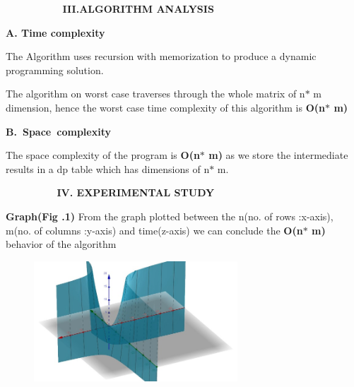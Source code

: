 \documentclass[10pt]{report}
\begin{document}
\begin{multicols}{2}
\vspace{\baselineskip}

\vspace{\baselineskip}

\vspace{\baselineskip}
\textbf{\ \ \ \ \ \ \ \ \ \   III.ALGORITHM ANALYSIS}\par


\vspace{\baselineskip}
\textbf{A. Time complexity}\par


\vspace{\baselineskip}
The\textbf{ }Algorithm uses recursion with memorization to produce a dynamic programming solution. \par

The algorithm on worst case traverses through the whole matrix of n$\ast$ m dimension, hence the worst case time complexity of this algorithm is  \textbf{O(n$\ast$ m)}\par


\vspace{\baselineskip}

\vspace{\baselineskip}
\textbf{B.\ Space\ complexity\    \ \ \ \ \  }\par


\vspace{\baselineskip}
The space complexity of the program is \textbf{O(n$\ast$ m)} as we store the intermediate results in a dp table which has dimensions of n$\ast$ m.\par


\vspace{\baselineskip}
\textbf{\ \ \ \ \ \ \ \  \  IV. EXPERIMENTAL STUDY\  }\par


\vspace{\baselineskip}
\textbf{Graph(Fig .1) }From the graph plotted between the n(no. of rows :x-axis), m(no. of columns :y-axis) and time(z-axis) we can conclude the \textbf{O(n$\ast$ m)} behavior of the algorithm\par


\vspace{\baselineskip}



\begin{figure}[H]
	\begin{Center}
		\includegraphics[width=3.0in,height=1.77in]{./media/image2.jpeg}
	\end{Center}
\end{figure}



\end{multicols}
\end{document}
